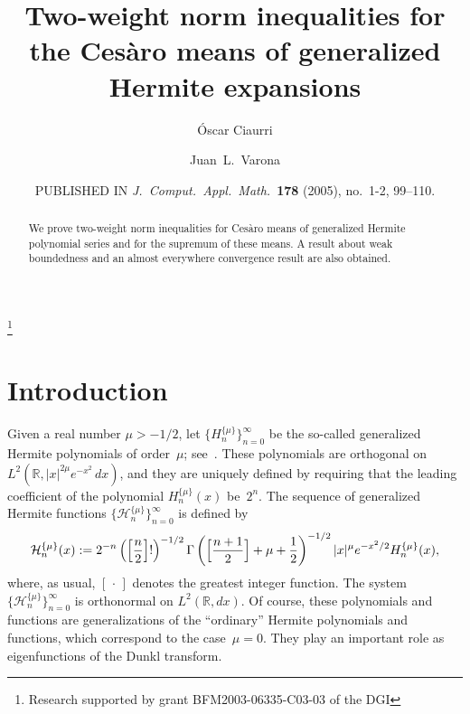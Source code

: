 \documentclass{amsart}
\date{PUBLISHED IN \textit{J.\ Comput.\ Appl.\ Math.}\ \textbf{178}
  (2005), no.~1-2, 99--110.}
\theoremstyle{plain}
\theoremstyle{definition}
\theoremstyle{remark}
\newcommand{\herfun}[2]{\mathcal{H}_{#1}^{\{#2\}}}
\newcommand{\herpol}[2]{H_{#1}^{\{#2\}}}
\newcommand{\I}{\infty}
\begin{document}
\title[Ces\`aro means of generalized Hermite expansions]
{Two-weight norm inequalities for the Ces\`aro means
of generalized Hermite expansions}

\author[\'O. Ciaurri]{\'Oscar Ciaurri}
\address{Departamento de Matem\'aticas y Computaci\'on,
Universidad de La Rioja, Edificio J.~L.~Vives,
Calle Luis de Ulloa s/n, 26004 Logro\~no, Spain}

\author[J. L. Varona]{Juan~L.~Varona}
\address{Departamento de Matem\'aticas y Computaci\'on,
Universidad de La Rioja, Edificio J.~L.~Vives,
Calle Luis de Ulloa s/n, 26004 Logro\~no, Spain}
\thanks{Research supported by grant BFM2003-06335-C03-03 of the DGI}


\begin{abstract}
We prove two-weight norm inequalities for Ces\`aro means of generalized Hermite polynomial series
and for the supremum of these means. A result about weak boundedness and an almost everywhere
convergence result are also obtained.
\end{abstract}

\maketitle

\section{Introduction}

Given a real number $\mu > -1/2$, let $\{\herpol{n}{\mu}\}_{n=0}^\I$ be the
so-called generalized Hermite polynomials of order~$\mu$;
see~\cite[Ch.~V, \S\,2 (G), p.~156]{Ch}.
These polynomials are orthogonal on $L^2(\mathbb{R},|x|^{2\mu} e^{-x^2}\,dx)$,
and they are uniquely defined by requiring that the leading coefficient
of the polynomial $\herpol{n}{\mu}(x)$ be~$2^n$. 
The sequence of generalized Hermite functions
$\{\herfun{n}{\mu}\}_{n = 0}^{\I}$ is defined by
\[
  \herfun{n}{\mu}(x) :=
  2^{-n} \left(\Bigl[\frac{n}{2}\Bigr]!\right)^{-1/2}
    \Gamma\left(\Bigl[\frac{n+1}{2}\Bigr]
      +\mu+\frac{1}{2}\right)^{-1/2}
  |x|^{\mu} e^{-x^2/2} \herpol{n}{\mu}(x),
\]
where, as usual, $[\,\cdot\,]$ denotes the greatest
integer function.
The system $\{\herfun{n}{\mu}\}_{n=0}^\I$ is orthonormal on
$L^2(\mathbb{R},dx)$.
Of course, these polynomials and functions are generalizations
of the ``ordinary'' Hermite polynomials and functions, which correspond
to the case~$\mu=0$. They play an important role as
eigenfunctions of the Dunkl transform.
\end{document}
